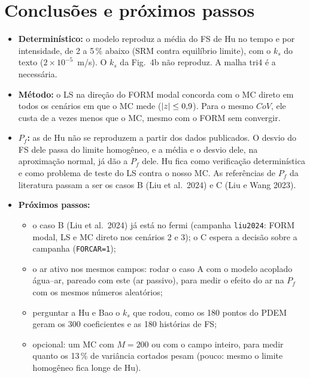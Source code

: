 \documentclass[11pt,a4paper]{article}
\begin{document}
\section{Conclusões e próximos passos}\label{sec:conclusoes}
\begin{itemize}
  \item \textbf{Determinístico:} o modelo reproduz a média do FS de Hu no tempo e por intensidade, de 2 a 5\,\% abaixo
    (SRM contra equilíbrio limite), com o $k_s$ do texto ($2 \times 10^{-5}$~m/s). O $k_s$ da Fig.~4b não reproduz. A
    malha tri4 é a necessária.
  \item \textbf{Método:} o LS na direção do FORM modal concorda com o MC direto em todos os cenários em que o MC
    mede ($|z| \le 0{,}9$). Para o mesmo $CoV$, ele custa de \razaoTrinta{} a \razaoTrintaSeis{} vezes menos que o MC, mesmo com o FORM sem
    convergir.
  \item \textbf{$P_f$:} as de Hu não se reproduzem a partir dos dados publicados. O desvio do FS dele passa do limite
    homogêneo, e a média e o desvio dele, na aproximação normal, já dão a $P_f$ dele. Hu fica como verificação
    determinística e como problema de teste do LS contra o nosso MC. As referências de $P_f$ da literatura passam a ser
    os casos B (Liu et al.~2024) e C (Liu e Wang 2023).
  \item \textbf{Próximos passos:}
    \begin{itemize}
      \item o caso B (Liu et al.\ 2024) já está no fermi (campanha \texttt{liu2024}: FORM modal, LS e MC direto nos
        cenários 2 e 3); o C espera a decisão sobre a campanha (\texttt{FORCAR=1});
      \item o ar ativo nos mesmos campos: rodar o caso A com o modelo acoplado água--ar, pareado com este (ar
        passivo), para medir o efeito do ar na $P_f$ com os mesmos números aleatórios;
      \item perguntar a Hu e Bao o $k_s$ que rodou, como os 180 pontos do PDEM geram os 300 coeficientes e as 180
        histórias de FS;
      \item opcional: um MC com $M = 200$ ou com o campo inteiro, para medir quanto os 13\,\% de variância cortados
        pesam (pouco: mesmo o limite homogêneo fica longe de Hu).
    \end{itemize}
\end{itemize}
\end{document}
